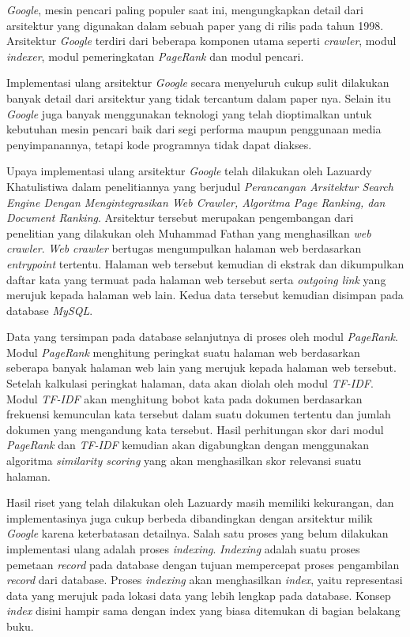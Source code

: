 \emph{Google}, mesin pencari paling populer saat ini, mengungkapkan detail dari
arsitektur yang digunakan dalam sebuah paper yang di rilis pada tahun 1998.
Arsitektur \emph{Google} terdiri dari beberapa komponen utama seperti
\emph{crawler}, modul \emph{indexer}, modul pemeringkatan \emph{PageRank} dan
modul pencari.

Implementasi ulang arsitektur \emph{Google} secara menyeluruh cukup sulit
dilakukan banyak detail dari arsitektur yang tidak tercantum dalam paper nya.
Selain itu \emph{Google} juga banyak menggunakan teknologi yang telah
dioptimalkan untuk kebutuhan mesin pencari baik dari segi performa maupun
penggunaan media penyimpanannya, tetapi kode programnya tidak dapat diakses.

Upaya implementasi ulang arsitektur \emph{Google} telah dilakukan oleh Lazuardy
Khatulistiwa dalam penelitiannya yang berjudul \emph{Perancangan Arsitektur
Search Engine Dengan Mengintegrasikan Web Crawler, Algoritma Page Ranking, dan
Document Ranking}. Arsitektur tersebut merupakan pengembangan dari penelitian
yang dilakukan oleh Muhammad Fathan yang menghasilkan \emph{web crawler}.
\emph{Web crawler} bertugas mengumpulkan halaman web berdasarkan
\emph{entrypoint} tertentu.  Halaman web tersebut kemudian di ekstrak dan
dikumpulkan daftar kata yang termuat pada halaman web tersebut serta
\emph{outgoing link} yang merujuk kepada halaman web lain. Kedua data tersebut
kemudian disimpan pada database \emph{MySQL}.

Data yang tersimpan pada database selanjutnya di proses oleh modul
\emph{PageRank}. Modul \emph{PageRank} menghitung peringkat suatu halaman web
berdasarkan seberapa banyak halaman web lain yang merujuk kepada halaman web
tersebut. Setelah kalkulasi peringkat halaman, data akan diolah oleh modul
\emph{TF-IDF}. Modul \emph{TF-IDF} akan menghitung bobot kata pada dokumen
berdasarkan frekuensi kemunculan kata tersebut dalam suatu dokumen tertentu dan
jumlah dokumen yang mengandung kata tersebut. Hasil perhitungan skor dari modul
\emph{PageRank} dan \emph{TF-IDF} kemudian akan digabungkan dengan menggunakan
algoritma \emph{similarity scoring} yang akan menghasilkan skor relevansi suatu
halaman.

Hasil riset yang telah dilakukan oleh Lazuardy masih memiliki kekurangan, dan
implementasinya juga cukup berbeda dibandingkan dengan arsitektur milik
\emph{Google} karena keterbatasan detailnya.  Salah satu proses yang belum
dilakukan implementasi ulang adalah proses \emph{indexing}. \emph{Indexing}
adalah suatu proses pemetaan \emph{record} pada database dengan tujuan
mempercepat proses pengambilan \emph{record} dari database. Proses
\emph{indexing} akan menghasilkan \emph{index}, yaitu representasi data yang
merujuk pada lokasi data yang lebih lengkap pada database. Konsep \emph{index}
disini hampir sama dengan index yang biasa ditemukan di bagian belakang buku.

